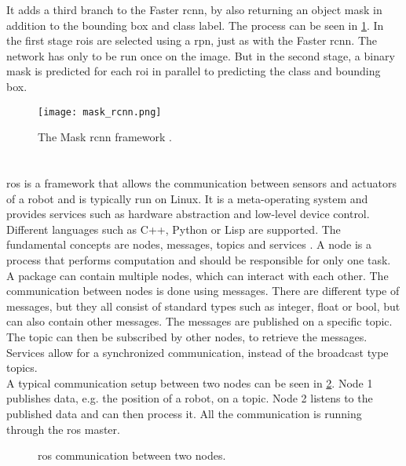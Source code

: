 It adds a third branch to the Faster \gls{rcnn}, by also returning an object mask in addition to the bounding box and class label.
The process can be seen in \cref{fig:mask_rcnn}.
In the first stage \glspl{roi} are selected using a \gls{rpn}, just as with the Faster \gls{rcnn}.
The network has only to be run once on the image.
But in the second stage, a binary mask is predicted for each \gls{roi} in parallel to predicting the class and bounding box.
\begin{figure}[htbp]
	\centering
	\texttt{[image: mask\_rcnn.png]}
	\caption[Mask \acrshort{rcnn} framework]{The Mask \acrshort{rcnn} framework \cite{He2017}.}
	\label{fig:mask_rcnn}
\end{figure}



\section{}
\label{sec:ros}
\acrfull{ros} is a framework that allows the communication between sensors and actuators of a robot and is typically run on Linux.
It is a meta-operating system and provides services such as hardware abstraction and low-level device control.
Different languages such as C++, Python or Lisp are supported.
The fundamental concepts are nodes, messages, topics and services \cite{Quigley2009}.
A node is a process that performs computation and should be responsible for only one task.
A package can contain multiple nodes, which can interact with each other.
The communication between nodes is done using messages.
There are different type of messages, but they all consist of standard types such as integer, float or bool, but can also contain other messages.
The messages are published on a specific topic.
The topic can then be subscribed by other nodes, to retrieve the messages.
Services allow for a synchronized communication, instead of the broadcast type topics.\\
A typical communication setup between two nodes can be seen in \cref{fig:ros_framework}.
Node 1 publishes data, e.g. the position of a robot, on a topic.
Node 2 listens to the published data and can then process it.
All the communication is running through the \gls{ros} master.
\begin{figure}[htb]
	\centering
	
	\caption[\acrshort{ros} communication]{\acrshort{ros} communication between two nodes.}
	\label{fig:ros_framework}
\end{figure}